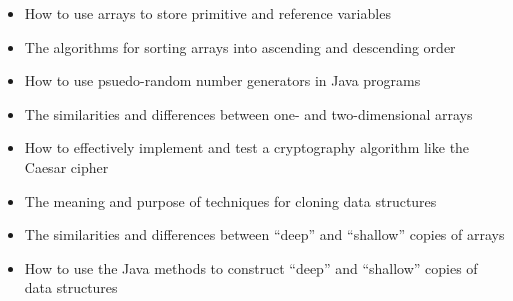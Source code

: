 \documentclass[11pt]{article}
\begin{document}
\begin{itemize}


  \item How to use arrays to store primitive and reference variables

  \item The algorithms for sorting arrays into ascending and descending order

  \item How to use psuedo-random number generators in Java programs

  \item The similarities and differences between one- and two-dimensional arrays

  \item How to effectively implement and test a cryptography algorithm like the
    Caesar cipher

  \item The meaning and purpose of techniques for cloning data structures

  \item The similarities and differences between ``deep'' and ``shallow'' copies
    of arrays

  \item How to use the Java methods to construct ``deep'' and ``shallow'' copies
    of data structures

\end{itemize}

\end{document}
